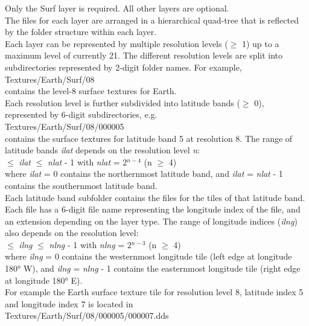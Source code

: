 \documentclass[Orbiter Developer Manual.tex]{subfiles}
\begin{document}
\noindent
Only the Surf layer is required. All other layers are optional.\\
The files for each layer are arranged in a hierarchical quad-tree that is reflected by the folder structure within each layer.\\
Each layer can be represented by multiple resolution levels ($\geq$ 1) up to a maximum level of currently 21. The different resolution levels are split into subdirectories represented by 2-digit folder names. For example,\\
\indent Textures/Earth/Surf/08\\
contains the level-8 surface textures for Earth.\\
Each resolution level is further subdivided into latitude bands ($\geq$ 0), represented by 6-digit subdirectories, e.g.\\
\indent Textures/Earth/Surf/08/000005\\
contains the surface textures for latitude band 5 at resolution 8. The range of latitude bands \textit{ilat} depends on the resolution level \textit{n}:\\
 $\leq$ \textit{ilat} $\leq$ \textit{nlat} - 1  with  \textit{nlat} = 2$^{n-4}$  (n $\geq$ 4)\\
where \textit{ilat} = 0 contains the northernmost latitude band, and \textit{ilat} = \textit{nlat} - 1 contains the southernmost latitude band.\\
Each latitude band subfolder contains the files for the tiles of that latitude band. Each file has a 6-digit file name representing the longitude index of the file, and an extension depending on the layer type. The range of longitude indices (\textit{ilng}) also depends on the resolution level:\\
 $\leq$ \textit{ilng} $\leq$ \textit{nlng} - 1  with  \textit{nlng} = 2$^{n-3}$  (n $\geq$ 4)\\
where \textit{ilng} = 0 contains the westernmost longitude tile (left edge at longitude 180° W), and \textit{ilng} = \textit{nlng} - 1 contains the easternmost longitude tile (right edge at longitude 180° E).\\
For example the Earth surface texture tile for resolution level 8, latitude index 5 and longitude index 7 is located in\\
\indent Textures/Earth/Surf/08/000005/000007.dds
\end{document}
